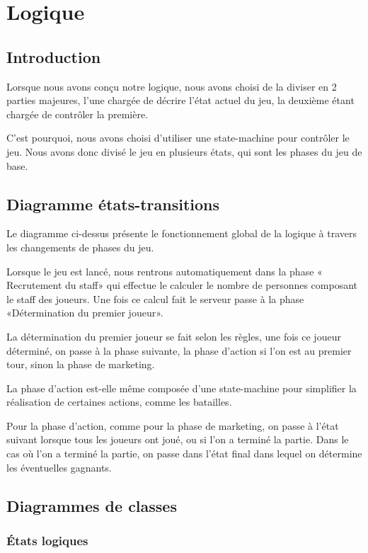 \chapter{Logique} \label{chapter:logique}
\section{Introduction}
Lorsque nous avons conçu notre logique, nous avons choisi de la diviser en 2
parties majeures, l'une chargée de décrire l'état actuel du jeu, la deuxième
étant chargée de contrôler la première.

C'est pourquoi, nous avons choisi d'utiliser une
state-machine pour contrôler le jeu.
Nous avons donc divisé le jeu en plusieurs états, qui sont les phases du jeu de base.

\section{Diagramme états-transitions}


Le diagramme ci-dessus présente le fonctionnement global de la logique à travers
les changements de phases du jeu.

Lorsque le jeu est lancé, nous rentrons automatiquement dans la phase «
Recrutement du staff» qui effectue le calculer le nombre de
personnes composant le staff des joueurs.
Une fois ce calcul fait le serveur passe à la phase «Détermination du premier joueur».

La détermination du premier joueur se fait selon les règles, une fois ce joueur
déterminé, on passe à la phase suivante, la phase d'action si l'on est au premier
tour, sinon la phase de marketing.

La phase d'action est-elle même composée d'une state-machine pour simplifier la
réalisation de certaines actions, comme les batailles.

Pour la phase d'action, comme pour la phase de marketing, on passe à l'état
suivant lorsque tous les joueurs ont joué, ou si l'on a terminé la partie.
Dans le cas où l'on a terminé la partie, on passe dans l'état final dans lequel
on détermine les éventuelles gagnants.

\section{Diagrammes de classes}
\subsection{États logiques}

